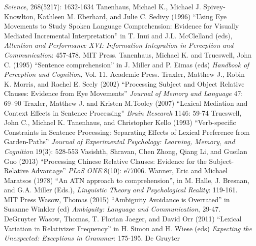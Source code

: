 \documentclass[a4paper]{article}
\begin{document}
{\it Science}, 268(5217): 1632-1634
\newline
\newline
Tanenhaus, Michael K., Michael J. Spivey-Knowlton, Kathleen M. Eberhard, and Julie C. Sedivy (1996)  ``Using Eye Movements to Study Spoken Language Comprehension:  Evidence for Visually Mediated Incremental Interpretation''  in T. Inui and J.L. McClelland (eds), {\it Attention and Performance XVI:  Information Integration in Perception and Communication}: 457-478. MIT Press. 
\newline
\newline
Tanenhaus, Michael K. and Trueswell, John C. (1995)  ``Sentence comprehension'' in J. Miller and P. Eimas (eds) {\it Handbook of Perception and Cognition}, Vol. 11.  Academic Press.
\newline
\newline
Traxler, Matthew J., Robin K. Morris, and Rachel E. Seely (2002) ``Processing Subject and Object Relative Clauses: 
Evidence from Eye Movements'' {\it Journal of Memory and Language} 47: 69–90 
\newline
\newline
Traxler, Matthew J. and Kristen M.Tooley (2007) ``Lexical Mediation and Context Effects in Sentence Processing''  {\it Brain Research}
1146: 59-74
\newline
\newline
Trueswell, John C., Michael K. Tanenhaus, and Christopher Kello (1993) ``Verb-specific Constraints in Sentence Processing: Separating Effects of Lexical Preference from Garden-Paths'' {\it Journal of Experimental Psychology: Learning, Memory, and Cognition} 19(3): 528-553
\newline
\newline
Vasishth, Shravan, Chen Zhong, Qiang Li, and Gueilan Guo (2013) ``Processing Chinese Relative Clauses: Evidence for the Subject-Relative Advantage'' {\it PLoS ONE} 8(10): e77006.
\newline    
\newline
Wanner, Eric and Michael Maratsos (1978) ``An ATN approach to comprehension'', in M. Halle, J. Bresnan, and G.A. Miller (Eds.), {\it Linguistic Theory and Psychological Reality}: 119-161. MIT Press
\newline
\newline
Wasow, Thomas  (2015) ``Ambiguity Avoidance is Overrated'' in Susanne Winkler (ed) {\it Ambiguity: Language and Communication}, 29-47. DeGruyter
 \newline
\newline
Wasow, Thomas, T. Florian Jaeger, and David Orr (2011) ``Lexical Variation in Relativizer Frequency'' in H. Simon and H. Wiese (eds) {\it Expecting the Unexpected: Exceptions in Grammar}: 175-195. De Gruyter 
\end{document}
